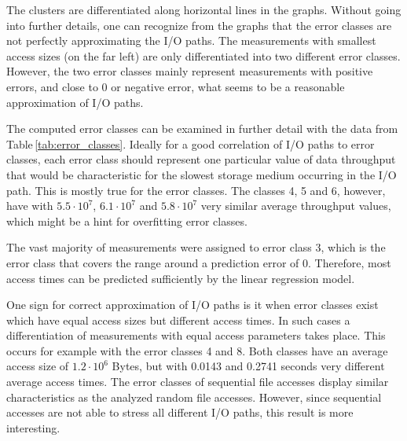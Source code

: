 \documentclass{superfri}
\begin{document}
	
	The clusters are differentiated along horizontal lines in the graphs.
	Without going into further details, one can recognize from the graphs that the error classes are not perfectly approximating the I/O paths.
	The measurements with smallest access sizes (on the far left) are only differentiated into two different error classes.
	However, the two error classes mainly represent measurements with positive errors, and close to 0 or negative error, what seems to be a reasonable approximation of I/O paths.\medskip
	
	The computed error classes can be examined in further detail with the data from Table\,\ref{tab:error_classes}.
	Ideally for a good correlation of I/O paths to error classes, each error class should represent one particular value of data throughput that would be characteristic for the slowest storage medium occurring in the I/O path. 
	This is mostly true for the error classes. The classes 4, 5 and 6, however, have with $5.5\cdot10^7$, $6.1\cdot10^7$ and $5.8\cdot10^7$ very similar average throughput values, which might be a hint for overfitting error classes.
	
	
	The vast majority of measurements were assigned to error class 3, which is the error class that covers the range around a prediction error of 0.
	Therefore, most access times can be predicted sufficiently by the linear regression model.
	
	One sign for correct approximation of I/O paths is it when error classes exist which have equal access sizes but different access times.
	In such cases a differentiation of measurements with equal access parameters takes place.
	This occurs for example with the error classes 4 and 8. Both classes have an average access size of $1.2\cdot10^6$ Bytes, but with 0.0143 and 0.2741 seconds very different average access times.
	The error classes of sequential file accesses display similar characteristics as the analyzed random file accesses.
	However, since sequential accesses are not able to stress all different I/O paths, this result is more interesting.
	
\end{document}
